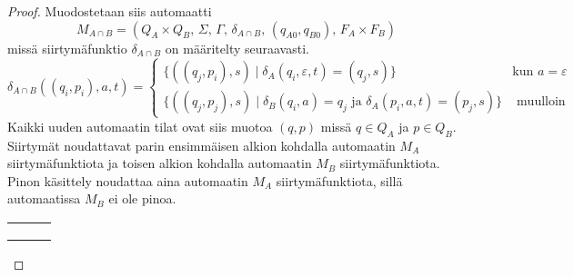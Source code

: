 \documentclass[a4paper,11pt, draft]{article}
\newcommand{\ve}{\varepsilon}
\newenvironment{automata}[1][2.8]%
{\begin{tikzpicture}[->,>=stealth',shorten >=1pt,auto,node distance=#1cm,semithick]}%
{\end{tikzpicture}}
\begin{document}
\begin{enumerate}
\begin{enumerate}
\begin{proof}
        Muodostetaan siis automaatti
        \begin{equation*}
          M_{A \cap B} = (Q_A \times Q_B \text{, } \Sigma \text{, } \Gamma
          \text{, } \delta_{A \cap B} \text{, } (q_{A0}, q_{B0}) \text{, } F_A
          \times F_B)
        \end{equation*}
        missä siirtymäfunktio $\delta_{A \cap B}$ on määritelty seuraavasti.
%
        \begin{equation*}
          \delta_{A \cap B}((q_i, p_i), a, t) = 
          \begin{cases}
            \{((q_j, p_i),s) \mid \delta_A(q_i, \ve, t) = (q_j, s)\} & \text{
              kun } a = \ve \\

            \{((q_j, p_j),s) \mid \delta_B(q_i, a) = q_j \text{ ja }
            \delta_A(p_i, a, t) = (p_j, s)\} & \text{ muulloin}
          \end{cases}
        \end{equation*}
%
        Kaikki uuden automaatin tilat ovat siis muotoa $(q, p)$ missä $q \in
        Q_A$ ja $p \in Q_B$. Siirtymät noudattavat parin ensimmäisen alkion
        kohdalla automaatin $M_A$ siirtymäfunktiota ja toisen alkion kohdalla
        automaatin $M_B$ siirtymäfunktiota. Pinon käsittely noudattaa aina
        automaatin $M_A$ siirtymäfunktiota, sillä automaatissa $M_B$ ei ole
        pinoa.
%
        \begin{center}
\end{center}
\end{proof}
\end{enumerate}
\end{enumerate}
\end{document}
